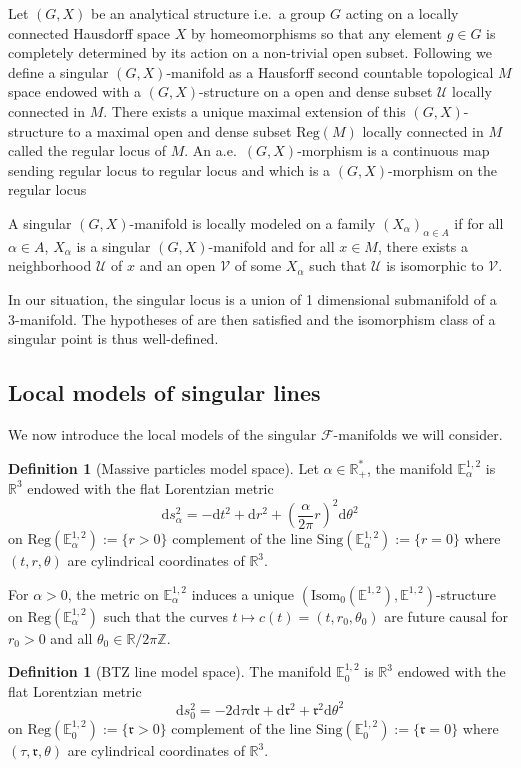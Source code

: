 \documentclass[a4paper,12pt]{article}
\def\ZZ{\mathbb{Z}}
\def\r{\mathfrak{r}}
\def\U{\mathcal U}
\def\isom{Isom}
\def\V{\mathcal V}
\def\d{\mathrm{d}}
\def\sing{\mathrm{Sing}}
\def\RR{\mathbb{R}}
\newcommand{\mass}[1]{{\mathbb E}^{1,2}_{#1}}
\def\isom{\mathrm{Isom}}
\def\Reg{\mathrm{Reg}}
\def\reg{\Reg}
\def\V{\mathcal V}
\def\Future{\mathcal F}
\def\sing{\mathrm{Sing}}
\def\isom{\mathrm{Isom}}
\def\d{\mathrm{d}}
\def\reg{\mathrm{Reg}}
\def\U{\mathcal{U}}
\def\Reg{\mathrm{Reg}}
\def\r{\mathfrak{r}}
\def\sing{\mathrm{Sing}}
\def\GG{\isom_0(\mass{})}
\theoremstyle{definition}
\newtheorem{defi}[lem]{Definition}	%
\begin{document}
		Let $(G,X)$ be an analytical structure i.e.\ a group $G$ acting on a locally connected Hausdorff space $X$ by homeomorphisms so that any element $g\in G$ is completely determined by its action on a non-trivial open subset. Following \cite{GXramcover} we define a singular $(G,X)$-manifold as a Hausforff second countable topological $M$ space endowed with a $(G,X)$-structure on a open and dense subset $\U$ locally connected in $M$. There exists a unique maximal extension of this $(G,X)$-structure to a maximal open and dense subset $\reg(M)$ locally connected in $M$ called the regular locus of $M$.
		An a.e.\ $(G,X)$-morphism is a continuous map sending regular locus to regular locus and which is a $(G,X)$-morphism on the regular locus 
		
		A singular $(G,X)$-manifold is locally modeled on a family $(X_\alpha)_{\alpha\in A}$ if for all $\alpha\in A$, $X_\alpha$ is a singular $(G,X)$-manifold and for all $x\in M$, there exists a neighborhood $\U$ of $x$ and an open $\V$ of some $X_\alpha$ such that $\U$ is isomorphic to $\V$.
		
		In our situation, the singular locus is a union of 1 dimensional submanifold of a 3-manifold. The hypotheses of \cite{GXramcover} are then satisfied and the isomorphism class of a singular point is thus well-defined.
		
		\subsection{Local models of singular lines}
		
			We now introduce the local models of the singular $\Future$-manifolds we will consider.
			\begin{defi}[Massive particles model space]
		 Let $\alpha\in \RR_+^*$, the manifold $\mass{\alpha}$ is $\RR^3$ endowed with the flat Lorentzian metric $$\d s_\alpha ^2 = -\d t^2+\d r^2+\left(\frac{\alpha}{2\pi} r\right)^2 \d \theta^2$$ on $\reg(\mass{\alpha}):=\{r>0\}$ complement of the line $\sing(\mass{\alpha}):=\{r=0\}$ where $(t,r,\theta)$ are cylindrical coordinates of $\RR^3$. 
		\end{defi}

		For $\alpha>0$, the metric on $\mass{\alpha}$ induces a unique $(\GG,\mass{})$-structure on $\reg(\mass{\alpha})$ such that the curves $t\mapsto c(t)=(t,r_0,\theta_0)$ are future causal for $r_0>0$ and all $\theta_0\in \RR/2\pi\ZZ$.
		\begin{defi}[BTZ line model space]
		 The manifold $\mass{0}$ is $\RR^3$ endowed with the flat Lorentzian metric $$\d s_0 ^2 = -2\d \tau \d \r+\d \r^2+ \r^2\d \theta^2$$ on $\reg(\mass{0}):=\{\r>0\}$ complement of the line $\sing(\mass{0}):=\{\r=0\}$ where $(\tau,\r,\theta)$ are cylindrical coordinates of $\RR^3$. 
		\end{defi}
		
\end{document}
